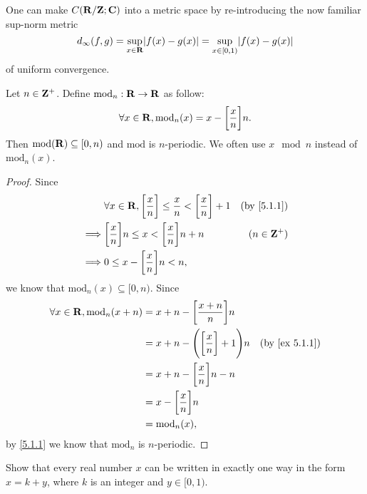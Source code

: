 \begin{note}
  One can make \(C(\mathbf{R} / \mathbf{Z} ; \mathbf{C})\) into a metric space by re-introducing the now familiar sup-norm metric
  \[
    d_\infty(f, g) = \sup_{x \in \R} \abs{f(x) - g(x)} = \sup_{x \in [0, 1)} \abs{f(x) - g(x)}
  \]
  of uniform convergence.
\end{note}

\begin{additional corollary}\label{ac 5.1.1}
Let \(n \in \mathbf{Z}^+\).
Define \(\text{mod}_n : \mathbf{R} \to \mathbf{R}\) as follow:
\[
  \forall x \in \mathbf{R}, \text{mod}_n(x) = x - \bigg[\frac{x}{n}\bigg] n.
\]
Then \(\text{mod}(\mathbf{R}) \subseteq [0, n)\) and \(\text{mod}\) is \(n\)-periodic.
We often use \(x \mod n\) instead of \(\text{mod}_n(x)\).
\end{additional corollary}

\begin{proof}
  Since
  \begin{align*}
             & \forall x \in \R, \bigg[\frac{x}{n}\bigg] \leq \frac{x}{n} < \bigg[\frac{x}{n}\bigg] + 1 & \text{(by \cref{5.1.1})} \\
    \implies & \bigg[\frac{x}{n}\bigg] n \leq x < \bigg[\frac{x}{n}\bigg] n + n                         & (n \in \Z^+)             \\
    \implies & 0 \leq x - \bigg[\frac{x}{n}\bigg] n < n,
  \end{align*}
  we know that \(\text{mod}_n(x) \subseteq [0, n)\).
  Since
  \begin{align*}
    \forall x \in \R, \text{mod}_n(x + n) & = x + n - \bigg[\frac{x + n}{n}\bigg] n                                           \\
                                          & = x + n - \Bigg(\bigg[\frac{x}{n}\bigg] + 1\Bigg) n & \text{(by \cref{ex 5.1.1})} \\
                                          & = x + n - \bigg[\frac{x}{n}\bigg] n - n                                           \\
                                          & = x - \bigg[\frac{x}{n}\bigg] n                                                   \\
                                          & = \text{mod}_n(x),
  \end{align*}
  by \cref{5.1.1} we know that \(\text{mod}_n\) is \(n\)-periodic.
\end{proof}

\exercisesection

\begin{exercise}\label{ex 5.1.1}
  Show that every real number \(x\) can be written in exactly one way in the form \(x = k + y\), where \(k\) is an integer and \(y \in [0, 1)\).
\end{exercise}

